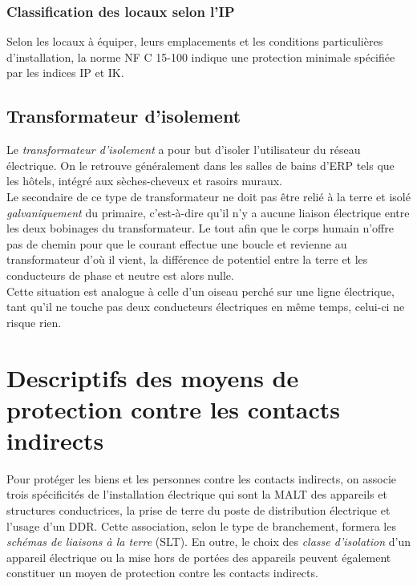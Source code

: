 \newpage
\begin{landscape}
\newpage



\newpage
\end{landscape}
\newpage
\subsubsection{Classification des locaux selon l'IP}

Selon les locaux à équiper, leurs emplacements et les conditions particulières d'installation, la norme NF C 15-100 indique une protection minimale spécifiée par les indices IP et IK.



\subsection{Transformateur d'isolement\label{subsec:transformateur_isolement}}

Le \emph{transformateur d'isolement} a pour but d'isoler l'utilisateur du réseau électrique. On le retrouve généralement dans les salles de bains d'ERP tels que les hôtels, intégré aux sèches-cheveux et rasoirs muraux.\\ 



Le secondaire de ce type de transformateur ne doit pas être relié à la terre et isolé \emph{galvaniquement} du primaire, c'est-à-dire qu'il n'y a aucune liaison électrique entre les deux bobinages du transformateur. Le tout afin que le corps humain n'offre pas de chemin pour que le courant effectue une boucle et revienne au transformateur d'où il vient, la différence de potentiel entre la terre et les conducteurs de phase et neutre est alors nulle.\\Cette situation est analogue à celle d'un oiseau perché sur une ligne électrique, tant qu'il ne touche pas deux conducteurs électriques en même temps, celui-ci ne risque rien.

\section{Descriptifs des moyens de protection contre les contacts indirects\label{sec:moyens_protection_contacts_indirects}}

Pour protéger les biens et les personnes contre les contacts indirects, on associe trois spécificités de l'installation électrique qui sont la MALT des appareils et structures conductrices, la prise de terre du poste de distribution électrique et l'usage d'un DDR. Cette association, selon le type de branchement, formera les \emph{schémas de liaisons à la terre} (SLT). En outre, le choix des \emph{classe d'isolation} d'un appareil électrique ou la mise hors de portées des appareils peuvent également constituer un moyen de protection contre les contacts indirects.

